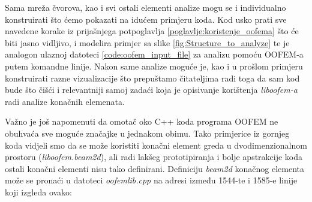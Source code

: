 \documentclass[a4paper,twoside,12pt]{memoir} %
\begin{document}
Sama mreža čvorova, kao i svi ostali elementi analize mogu se i individualno konstruirati što ćemo pokazati na idućem primjeru koda. Kod usko prati sve navedene korake iz prijašnjega potpoglavlja \ref{poglavlje:koristenje_oofema} što će biti jasno vidljivo, i modelira primjer sa slike \ref{fig:Structure_to_analyze} te je analogon ulaznoj datoteci \ref{code:oofem_input_file} za analizu pomoću OOFEM-a putem komandne linije. Nakon same analize moguće je, kao i u prošlom primjeru konstruirati razne vizualizacije što prepuštamo čitateljima radi toga da sam kod bude što čišći i relevantniji samoj zadaći koja je opisivanje korištenja \textit{liboofem-a} radi analize konačnih elemenata.



Važno je još napomenuti da omotač oko C++ koda programa OOFEM ne obuhvaća sve moguće značajke u jednakom obimu. Tako primjerice iz gornjeg koda vidjeli smo da se može koristiti konačni element greda u dvodimenzionalnom prostoru (\textit{liboofem.beam2d}), ali radi lakšeg prototipiranja i bolje apstrakcije koda ostali konačni elementi nisu tako definirani. Definiciju \textit{beam2d} konačnog elementa može se pronaći u datoteci \textit{oofemlib.cpp} na adresi \cite{oofemlib_source} između 1544-te i 1585-e linije koji izgleda ovako:
\end{document}
